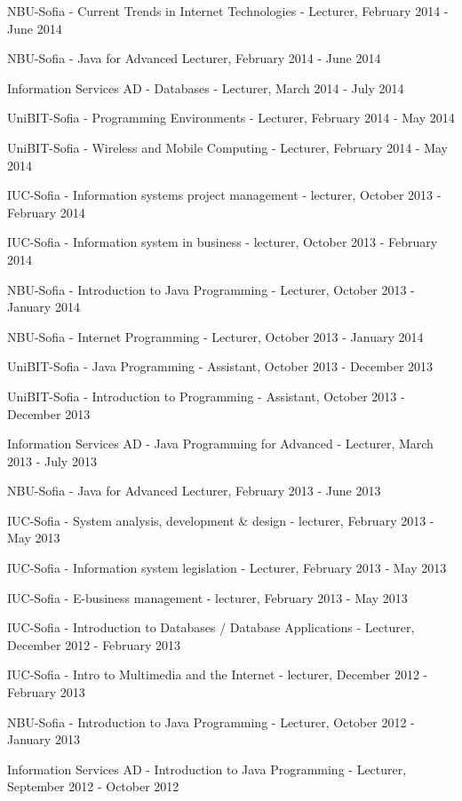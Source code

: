 \documentclass[english,a4paper]{europasscv}
\begin{document}
\begin{europasscv}
{\begin{ecvitemize}
    \item NBU-Sofia - Current Trends in Internet Technologies - Lecturer, February 2014 - June 2014
    \item NBU-Sofia - Java for Advanced Lecturer, February 2014 - June 2014
    \item Information Services AD - Databases - Lecturer, March 2014 - July 2014
    \item UniBIT-Sofia - Programming Environments - Lecturer, February 2014 - May 2014
    \item UniBIT-Sofia - Wireless and Mobile Computing - Lecturer, February 2014 - May 2014
    \item IUC-Sofia - Information systems project management - lecturer, October 2013 - February 2014
    \item IUC-Sofia - Information system in business - lecturer, October 2013 - February 2014
    \item NBU-Sofia - Introduction to Java Programming - Lecturer, October 2013 - January 2014
    \item NBU-Sofia - Internet Programming - Lecturer, October 2013 - January 2014
    \item UniBIT-Sofia - Java Programming - Assistant, October 2013 - December 2013
    \item UniBIT-Sofia - Introduction to Programming - Assistant, October 2013 - December 2013
    \item Information Services AD - Java Programming for Advanced - Lecturer, March 2013 - July 2013
    \item NBU-Sofia - Java for Advanced Lecturer, February 2013 - June 2013
    \item IUC-Sofia - System analysis, development \& design - lecturer, February 2013 - May 2013
    \item IUC-Sofia - Information system legislation - Lecturer, February 2013 - May 2013
    \item IUC-Sofia - E-business management - lecturer, February 2013 - May 2013
    \item IUC-Sofia - Introduction to Databases / Database Applications - Lecturer, December 2012 - February 2013
    \item IUC-Sofia - Intro to Multimedia and the Internet - lecturer, December 2012 - February 2013
    \item NBU-Sofia - Introduction to Java Programming - Lecturer, October 2012 - January 2013
    \item Information Services AD - Introduction to Java Programming - Lecturer, September 2012 - October 2012

\end{ecvitemize}}
\end{europasscv}
\end{document}
